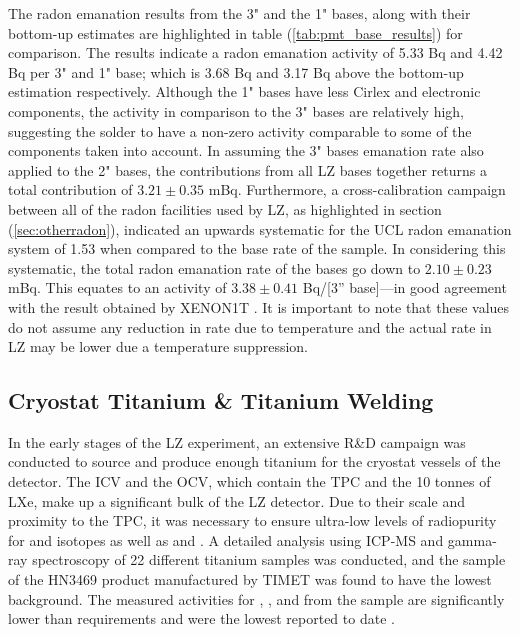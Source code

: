 %

%
The radon emanation results from the 3" and the 1" bases, along with their bottom-up estimates are highlighted in table (\ref{tab:pmt_base_results}) for comparison. The results indicate a radon emanation activity of 5.33 \micro{}Bq and 4.42 \micro{}Bq per 3" and 1" base; which is 3.68 \micro{}Bq and 3.17 \micro{}Bq above the bottom-up estimation respectively. Although the 1" bases have less Cirlex and electronic components, the activity in comparison to the 3" bases are relatively high, suggesting the solder to have a non-zero activity comparable to some of the components taken into account. In assuming the 3" bases emanation rate also applied to the 2" bases, the contributions from all LZ bases together returns a total contribution of $3.21 ± 0.35$ mBq.  Furthermore, a cross-calibration campaign between all of the radon facilities used by LZ, as highlighted in section (\ref{sec:otherradon}), indicated an upwards systematic for the UCL radon emanation system of 1.53 when compared to the base rate of the sample. In considering this systematic, the total radon emanation rate of the bases go down to $2.10\pm0.23$ mBq. This equates to an activity of $3.38\pm0.41$ \micro{}Bq/[3” base]---in good agreement with the result obtained by XENON1T \cite{Natascha}. It is important to note that these values do not assume any reduction in rate due to temperature and the actual rate in LZ may be lower due a temperature suppression.


\subsection{Cryostat Titanium \& Titanium Welding}
\label{secsec:titanium_emanation}

In the early stages of the LZ experiment, an extensive R\&D campaign was conducted to source and produce enough titanium for the cryostat vessels of the detector. The ICV and the OCV, which contain the TPC and the 10 tonnes of LXe, make up a significant bulk of the LZ detector. Due to their scale and proximity to the TPC, it was necessary to ensure ultra-low levels of radiopurity for \UTTE{} and \ThTTT{} isotopes as well as \KFZ{} and \CoSZ{}. A detailed analysis using ICP-MS and gamma-ray spectroscopy of 22 different titanium samples was conducted, and the sample of the HN3469 product manufactured by TIMET was found to have the lowest background. The measured activities for \UTTEe{}, \ThTTTe{}, \CoSZ{} and \KFZ{} from the sample are significantly lower than requirements and were the lowest reported to date \cite{LZ_titanium_selection}. 

